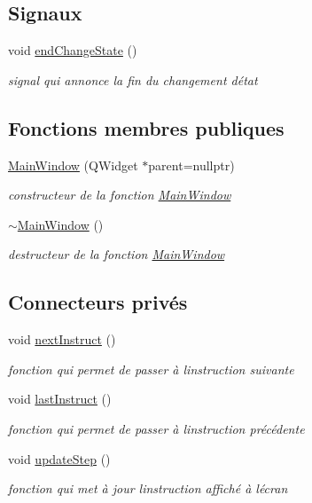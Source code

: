 \subsection*{Signaux}
\begin{DoxyCompactItemize}
\item 
void \hyperlink{classMainWindow_a2cd7fd54c497cd6a073ad43857266890}{end\+Change\+State} ()
\begin{DoxyCompactList}\small\item\em signal qui annonce la fin du changement d\textquotesingle{}état \end{DoxyCompactList}\end{DoxyCompactItemize}
\subsection*{Fonctions membres publiques}
\begin{DoxyCompactItemize}
\item 
\hyperlink{classMainWindow_a996c5a2b6f77944776856f08ec30858d}{Main\+Window} (Q\+Widget $\ast$parent=nullptr)
\begin{DoxyCompactList}\small\item\em constructeur de la fonction \hyperlink{classMainWindow}{Main\+Window} \end{DoxyCompactList}\item 
\hyperlink{classMainWindow_ae98d00a93bc118200eeef9f9bba1dba7}{$\sim$\+Main\+Window} ()
\begin{DoxyCompactList}\small\item\em destructeur de la fonction \hyperlink{classMainWindow}{Main\+Window} \end{DoxyCompactList}\end{DoxyCompactItemize}
\subsection*{Connecteurs privés}
\begin{DoxyCompactItemize}
\item 
void \hyperlink{classMainWindow_a0b79b7ea071fc3a4baa45f8394052ffd}{next\+Instruct} ()
\begin{DoxyCompactList}\small\item\em fonction qui permet de passer à l\textquotesingle{}instruction suivante \end{DoxyCompactList}\item 
void \hyperlink{classMainWindow_a715f753a6c46e3f10565a5a1b849ee86}{last\+Instruct} ()
\begin{DoxyCompactList}\small\item\em fonction qui permet de passer à l\textquotesingle{}instruction précédente \end{DoxyCompactList}\item 
void \hyperlink{classMainWindow_a344d21527850380c306fe7ac165321bd}{update\+Step} ()
\begin{DoxyCompactList}\small\item\em fonction qui met à jour l\textquotesingle{}instruction affiché à l\textquotesingle{}écran \end{DoxyCompactList}\end{DoxyCompactItemize}
